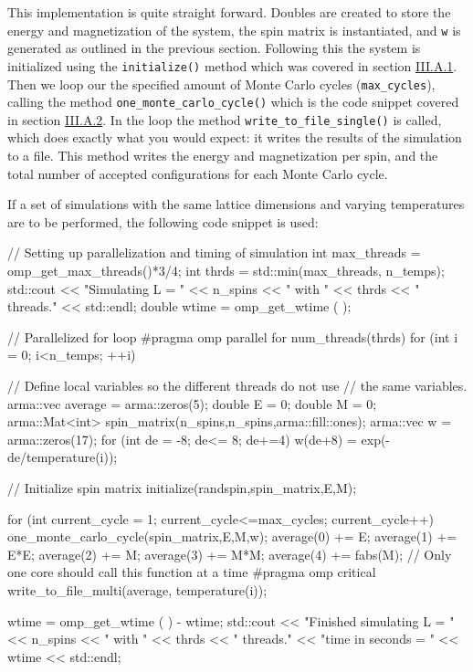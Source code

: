 \documentclass[reprint,english,notitlepage]{revtex4-1}  %
\begin{document}
This implementation is quite straight forward. Doubles are created to store the energy and magnetization of the system, the spin matrix is instantiated, and \verb+w+ is generated as outlined in the previous section. Following this the system is initialized using the \verb+initialize()+ method which was covered in section \hyperref[sec:III:a:i]{III.A.1}. Then we loop our the specified amount of Monte Carlo cycles (\verb+max_cycles+), calling the method \verb+one_monte_carlo_cycle()+ which is the code snippet covered in section \hyperref[sec:III:a:2]{III.A.2}. In the loop the method \verb+write_to_file_single()+ is called, which does exactly what you would expect: it writes the results of the simulation to a file. This method writes the energy and magnetization per spin, and the total number of accepted configurations for each Monte Carlo cycle. 

If a set of simulations with the same lattice dimensions and varying temperatures are to be performed, the following code snippet is used:

\begin{cpp}
// Setting up parallelization and timing of simulation
int max_threads = omp_get_max_threads()*3/4;
int thrds = std::min(max_threads, n_temps);
std::cout << "Simulating L = " << n_spins << " with " 
		  << thrds << " threads." << std::endl;
double wtime = omp_get_wtime ( );

// Parallelized for loop
#pragma omp parallel for num_threads(thrds)
for (int i = 0; i<n_temps; ++i) {
  // Define local variables so the different threads do not use 
  // the same variables.
  arma::vec average = arma::zeros(5);
  double E = 0;
  double M = 0;
  arma::Mat<int> spin_matrix(n_spins,n_spins,arma::fill::ones);
  arma::vec w = arma::zeros(17);
  for (int de = -8; de<= 8; de+=4) {
    w(de+8) = exp(-de/temperature(i));
  }

  // Initialize spin matrix
  initialize(randspin,spin_matrix,E,M);

  for (int current_cycle = 1; current_cycle<=max_cycles; 
  	   current_cycle++){
    one_monte_carlo_cycle(spin_matrix,E,M,w);
    average(0) += E;
    average(1) += E*E;
    average(2) += M;
    average(3) += M*M;
    average(4) += fabs(M);
  }
  // Only one core should call this function at a time
  #pragma omp critical
  write_to_file_multi(average, temperature(i));
}
wtime = omp_get_wtime ( ) - wtime;
std::cout << "Finished simulating L = " << n_spins << " with " 
	      << thrds << " threads."
  		  << "\nElapsed time in seconds = " << wtime << std::endl;
\end{cpp} 
\end{document}
